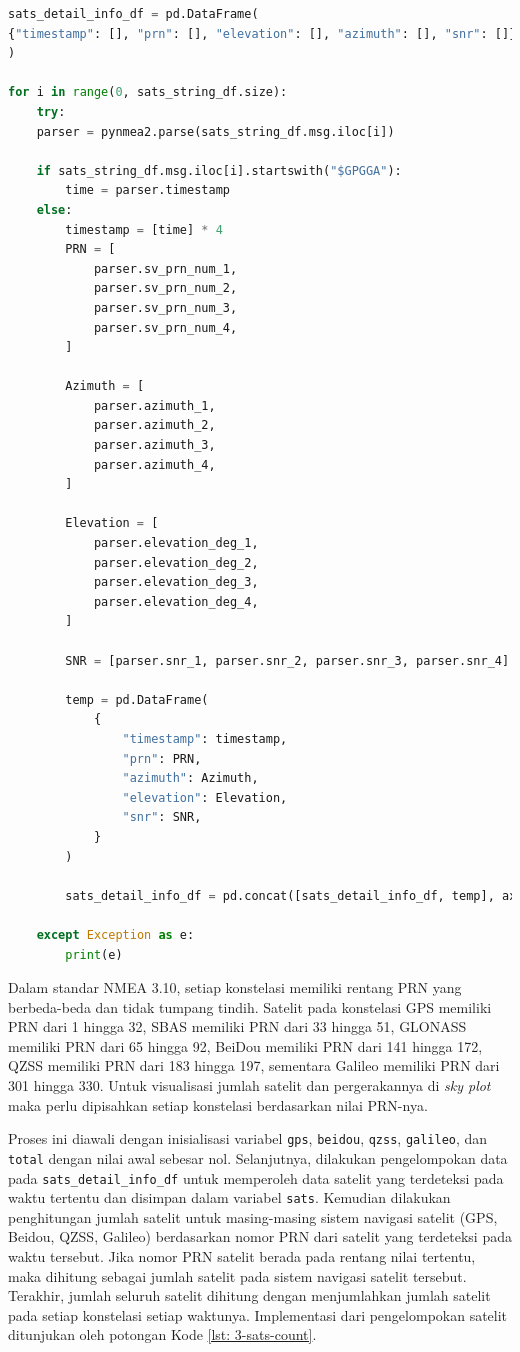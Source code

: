 \vspace{0.3cm}
\begin{lstlisting}[language=python, style=mystyle, caption={\textit{Parsing} Informasi Satelit pada Python}, label={lst: 3-sats-parse}]
sats_detail_info_df = pd.DataFrame(
{"timestamp": [], "prn": [], "elevation": [], "azimuth": [], "snr": []}
)

for i in range(0, sats_string_df.size):
	try:
	parser = pynmea2.parse(sats_string_df.msg.iloc[i])
	
	if sats_string_df.msg.iloc[i].startswith("$GPGGA"):
		time = parser.timestamp
	else:
		timestamp = [time] * 4
		PRN = [
			parser.sv_prn_num_1,
			parser.sv_prn_num_2,
			parser.sv_prn_num_3,
			parser.sv_prn_num_4,
		]

		Azimuth = [
			parser.azimuth_1,
			parser.azimuth_2,
			parser.azimuth_3,
			parser.azimuth_4,
		]

		Elevation = [
			parser.elevation_deg_1,
			parser.elevation_deg_2,
			parser.elevation_deg_3,
			parser.elevation_deg_4,
		]

		SNR = [parser.snr_1, parser.snr_2, parser.snr_3, parser.snr_4]
		
		temp = pd.DataFrame(
			{
				"timestamp": timestamp,
				"prn": PRN,
				"azimuth": Azimuth,
				"elevation": Elevation,
				"snr": SNR,
			}
		)
		
		sats_detail_info_df = pd.concat([sats_detail_info_df, temp], axis=0)
	
	except Exception as e:
		print(e)
\end{lstlisting}
	
Dalam standar NMEA 3.10, setiap konstelasi memiliki rentang PRN yang berbeda-beda dan tidak tumpang tindih. Satelit pada konstelasi GPS memiliki PRN dari 1 hingga 32, SBAS memiliki PRN dari 33 hingga 51, GLONASS memiliki PRN dari 65 hingga 92, BeiDou memiliki PRN dari 141 hingga 172, QZSS memiliki PRN dari 183 hingga 197, sementara Galileo memiliki PRN dari 301 hingga 330. Untuk visualisasi jumlah satelit dan pergerakannya di \textit{sky plot} maka perlu dipisahkan setiap konstelasi berdasarkan nilai PRN-nya.

Proses ini diawali dengan inisialisasi variabel \texttt{gps}, \texttt{beidou}, \texttt{qzss}, \texttt{galileo}, dan \texttt{total} dengan nilai awal sebesar nol. Selanjutnya, dilakukan pengelompokan data pada \texttt{sats\_detail\_info\_df} untuk memperoleh data satelit yang terdeteksi pada waktu tertentu dan disimpan dalam variabel \texttt{sats}. Kemudian dilakukan penghitungan jumlah satelit untuk masing-masing sistem navigasi satelit (GPS, Beidou, QZSS, Galileo) berdasarkan nomor PRN dari satelit yang terdeteksi pada waktu tersebut. Jika nomor PRN satelit berada pada rentang nilai tertentu, maka dihitung sebagai jumlah satelit pada sistem navigasi satelit tersebut. Terakhir, jumlah seluruh satelit dihitung dengan menjumlahkan jumlah satelit pada setiap konstelasi setiap waktunya. Implementasi dari pengelompokan satelit ditunjukan oleh potongan Kode \ref{lst: 3-sats-count}.

